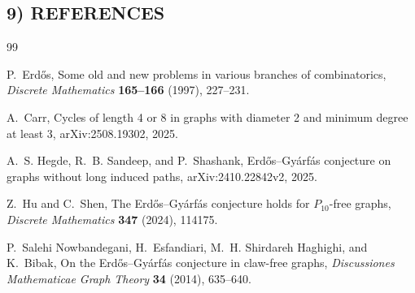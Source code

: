 \subsection*{9) REFERENCES}
\begin{thebibliography}{99}

P.~Erd\H{o}s,
\newblock Some old and new problems in various branches of combinatorics,
\newblock \emph{Discrete Mathematics} \textbf{165--166} (1997), 227--231.

A.~Carr,
\newblock Cycles of length 4 or 8 in graphs with diameter 2 and minimum degree at least 3,
\newblock arXiv:2508.19302, 2025.

A.~S. Hegde, R.~B. Sandeep, and P.~Shashank,
\newblock Erd\H{o}s--Gy\'arf\'as conjecture on graphs without long induced paths,
\newblock arXiv:2410.22842v2, 2025.

Z.~Hu and C.~Shen,
\newblock The Erd\H{o}s--Gy\'arf\'as conjecture holds for $P_{10}$-free graphs,
\newblock \emph{Discrete Mathematics} \textbf{347} (2024), 114175.

P.~Salehi Nowbandegani, H.~Esfandiari, M.~H. Shirdareh Haghighi, and K.~Bibak,
\newblock On the Erd\H{o}s--Gy\'arf\'as conjecture in claw-free graphs,
\newblock \emph{Discussiones Mathematicae Graph Theory} \textbf{34} (2014), 635--640.

\end{thebibliography}
